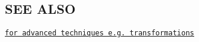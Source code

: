 \subsection*{S\+EE A\+L\+SO}


\begin{DoxyItemize}
\item \href{https://www.libelektra.org/ftp/elektra/publications/raab2015sharing.pdf}{\tt for advanced techniques e.\+g. transformations} 
\end{DoxyItemize}